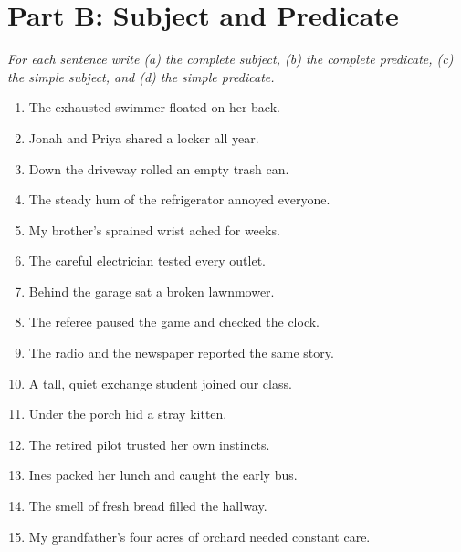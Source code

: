 \documentclass[11pt]{article}
\begin{document}
\section*{Part B: Subject and Predicate}
\textit{For each sentence write (a) the complete subject, (b) the complete predicate, (c) the simple
subject, and (d) the simple predicate.}
\begin{enumerate}
  \item The exhausted swimmer floated on her back.
  \vspace{0.55in}
  \item Jonah and Priya shared a locker all year.
  \vspace{0.55in}
  \item Down the driveway rolled an empty trash can.
  \vspace{0.55in}
  \item The steady hum of the refrigerator annoyed everyone.
  \vspace{0.55in}
  \item My brother's sprained wrist ached for weeks.
  \vspace{0.55in}
  \item The careful electrician tested every outlet.
  \vspace{0.55in}
  \item Behind the garage sat a broken lawnmower.
  \vspace{0.55in}
  \item The referee paused the game and checked the clock.
  \vspace{0.55in}
  \item The radio and the newspaper reported the same story.
  \vspace{0.55in}
  \item A tall, quiet exchange student joined our class.
  \vspace{0.55in}
  \item Under the porch hid a stray kitten.
  \vspace{0.55in}
  \item The retired pilot trusted her own instincts.
  \vspace{0.55in}
  \item Ines packed her lunch and caught the early bus.
  \vspace{0.55in}
  \item The smell of fresh bread filled the hallway.
  \vspace{0.55in}
  \item My grandfather's four acres of orchard needed constant care.
  \vspace{0.55in}
\end{enumerate}
\end{document}

